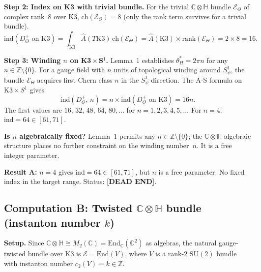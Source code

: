 \documentclass[11pt,a4paper]{article}
\theoremstyle{definition}
\theoremstyle{remark}
\begin{document}
\textbf{Step 2: Index on K3 with trivial bundle.}
For the trivial $\mathbb{C}\otimes\mathbb{H}$ bundle $\mathcal{E}_\Theta$
of complex rank~$8$ over K3, $\mathrm{ch}(\mathcal{E}_\Theta)=8$ (only the
rank term survives for a trivial bundle).
\begin{equation}
  \mathrm{ind}(D^+_\Theta\text{ on K3})
  = \int_{\mathrm{K3}} \hat{A}(T\mathrm{K3})\,\mathrm{ch}(\mathcal{E}_\Theta)
  = \hat{A}(\mathrm{K3})\times\mathrm{rank}(\mathcal{E}_\Theta)
  = 2\times 8 = 16.
  \label{eq:ind_K3_trivial}
\end{equation}

\textbf{Step 3: Winding $n$ on K3\,$\times$\,S$^1$.}
Lemma~1 establishes $\theta_H^* = 2\pi n$ for any $n\in\mathbb{Z}\setminus\{0\}$.
For a gauge field with $n$ units of topological winding around $S^1_\psi$,
the bundle $\mathcal{E}_\Theta$ acquires first Chern class $n$ in the
$S^1_\psi$ direction.  The A-S formula on $\mathrm{K3}\times S^1$ gives
\begin{equation}
  \mathrm{ind}(D^+_\Theta,\,n)
  = n\times\mathrm{ind}(D^+_\Theta\text{ on K3})
  = 16n.
  \label{eq:ind_K3S1_n}
\end{equation}
The first values are $16,\,32,\,48,\,64,\,80,\ldots$ for $n=1,2,3,4,5,\ldots$
For $n=4$: $\mathrm{ind}=64\in[61,71]$.

\textbf{Is $n$ algebraically fixed?}
Lemma~1 permits any $n\in\mathbb{Z}\setminus\{0\}$; the
$\mathbb{C}\otimes\mathbb{H}$ algebraic structure places no further
constraint on the winding number~$n$.  It is a free integer parameter.

\textbf{Result A:}
$n=4$ gives $\mathrm{ind}=64\in[61,71]$, but $n$ is a free parameter.
No fixed index in the target range.  Status: \textbf{[DEAD END]}.

\subsection{Computation B: Twisted $\mathbb{C}\otimes\mathbb{H}$ bundle
  (instanton number $k$)}
\label{subsec:L2_compB}

\textbf{Setup.}
Since $\mathbb{C}\otimes\mathbb{H}\cong M_2(\mathbb{C})
=\mathrm{End}_\mathbb{C}(\mathbb{C}^2)$ as algebras, the natural
gauge-twisted bundle over K3 is $\mathcal{E}=\mathrm{End}(V)$, where
$V$ is a rank-2 $\mathrm{SU}(2)$ bundle with instanton number
$c_2(V)=k\in\mathbb{Z}$.
\end{document}
